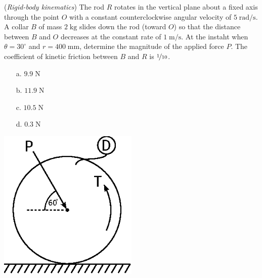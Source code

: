 \documentclass[addpoints, 12pt]{exam}
\begin{document}
\begin{questions}
\begin{minipage}{0.5\textwidth}
\question(\textit{Rigid-body kinematics})
The rod $R$ rotates in the vertical plane about a fixed axis through the point 
$O$ with a constant counterclockwise angular velocity of $5 \;
\unit{\radian\per\second}$. A collar $B$ of mass $2 \; \unit{\kilo\gram}$ slides
down the rod (toward $O$) so that the distance between $B$ and $O$ decreases at
the constant rate of $1 \; \unit{\meter\per\second}$. At the instaht when
$\theta = 30^\circ$ and $r = 400 \; \unit{\milli\meter}$, determine the 
magnitude of the applied force $P$. The coefficient of kinetic friction between 
$B$ and $R$ is $\nicefrac{1}{10}$. \\[0.5ex]

\begin{minipage}{0.45\textwidth}
    \begin{center}
    \begin{itemize}
        \setlength\itemsep{-0.4em}
        \item[a.] $9.9 \; \unit{\newton}$
        \item[b.] $11.9 \; \unit{\newton}$
    \end{itemize}
    \end{center}
\end{minipage}
\begin{minipage}{0.45\textwidth}
    \begin{center}
    \begin{itemize}
        \setlength\itemsep{-0.4em}
        \item[c.] $10.5 \; \unit{\newton}$
        \item[d.] $0.3 \; \unit{\newton}$
    \end{itemize}
    \end{center}
\end{minipage}

\end{minipage}
%
\begin{minipage}{0.5\textwidth}
    \centering
    \includegraphics[width=0.5\textwidth,valign=c]{./figures/question6.eps}
\end{minipage}




\end{questions}
\end{document}
